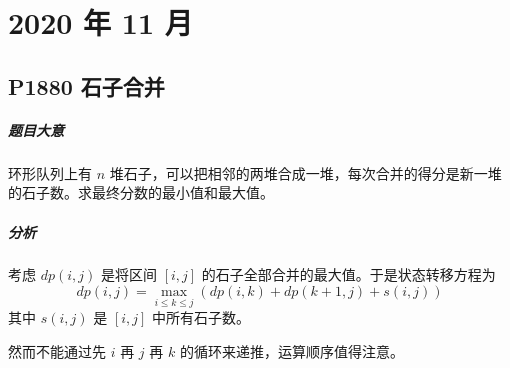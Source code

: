 \chapter{2020 年 11 月}

\section{P1880 石子合并}

\paragraph{题目大意}

环形队列上有 $n$ 堆石子，可以把相邻的两堆合成一堆，每次合并的得分是新一堆的石子数。求最终分数的最小值和最大值。

\paragraph{分析}

考虑 $dp(i,j)$ 是将区间 $[i,j]$ 的石子全部合并的最大值。于是状态转移方程为
\[ dp(i,j) = \max_{i \leqslant k \leqslant j}(dp(i,k) + dp(k+1,j) + s(i,j)) \]
其中 $s(i,j)$ 是 $[i,j]$ 中所有石子数。

然而不能通过先 $i$ 再 $j$ 再 $k$ 的循环来递推，运算顺序值得注意。
